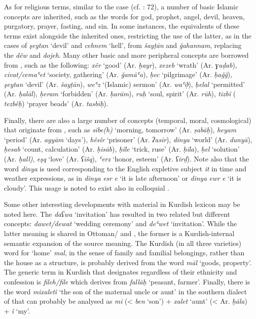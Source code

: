 \documentclass[output=paper]{langsci/langscibook}
\begin{document}
As for religious terms, similar to the  case (cf. \citealt{Perry2012}: 72), a number of basic Islamic concepts are inherited, such as the words for god, prophet, angel, devil, heaven, purgatory, prayer, fasting, and sin. In some instances, the  equivalents of these terms exist alongside the inherited ones, restricting the use of the latter, as in the cases of \textit{şeytan} ‘devil’ and \textit{cehnem} ‘hell’, from  \textit{šayṭān} and \textit{ǧahannam}, replacing the  \textit{dêw} and \textit{dojeh}. Many other basic and more peripheral concepts are borrowed from , such as the following: \textit{xêr} ‘good’ (Ar. \textit{ḫayr}), \textit{xezeb} ‘wrath’ (Ar. \textit{ɣaḍab}), \textit{civat/cemaʿet} ‘society, gathering’ (Ar. \textit{ǧamāʿa}), \textit{ḥec} ‘pilgrimage’ (Ar. \textit{ḥaǧǧ}), \textit{şeytan} ‘devil’ (Ar. \textit{šayṭān}), \textit{weʿz} ‘(Islamic) sermon’ (Ar. \textit{waʿð̣}), \textit{ḥelal} ‘permitted’ (Ar. \textit{ḥalāl}), \textit{ḥeram} ‘forbidden’ (Ar. \textit{ḥarām}), \textit{ruḥ} ‘soul, spirit’ (Ar. \textit{rūh}), \textit{tizbî} ( \textit{tezbêḥ}) ‘prayer beads’ (Ar. \textit{tasbīḥ}).  

Finally, there are also a large number of concepts (temporal, moral, cosmological) that originate from  , such as \textit{sibe(h)} ‘morning, tomorrow’ (Ar. \textit{ṣabāḥ}), \textit{heyam} ‘period’ (Ar. \textit{ayyām} ‘days’), \textit{hêsîr} ‘prisoner’ (Ar. \textit{ʔasīr}), \textit{dinya} ‘world’ (Ar. \textit{dunyā}), \textit{ḥesab} ‘count, calculation’ (Ar. \textit{ḥisāb}), \textit{ḥîle} ‘trick, ruse’ (Ar. \textit{ḥīla}), \textit{ḥel}  ‘solution’ (Ar. \textit{ḥall)}, \textit{eşq} ‘love’ (Ar. \textit{ʕišq}), \textit{ʿerz} ‘honor, esteem’ (Ar. \textit{ʕirḍ}). Note also that the word \textit{dinya} is used corresponding to the English expletive subject \textit{it} in time and weather expressions, as in \textit{dinya} \textit{esr} \textit{e} ‘it is late afternoon’ or \textit{dinya} \textit{ewr} \textit{e} ‘it is cloudy’. This usage is noted to exist also in colloquial  \citep[155]{Chyet2003}.

Some other interesting developments with  material in Kurdish lexicon may be noted here. The  \textit{daʕwa} ‘invitation’ has resulted in two related but different concepts: \textit{dawet/dewat} ‘wedding ceremony’ and \textit{deʿwet} ‘invitation’. While the latter meaning is shared in Ottoman/ and , the former is a Kurdish-internal semantic expansion of the source meaning. The Kurdish (in all three varieties) word for ‘home’ \textit{mal}, in the sense of family and familial belongings, rather than the house as a structure, is probably derived from the  word \textit{māl} ‘goods, property’. The generic term in Kurdish that designates  regardless of their ethnicity and confession is \textit{fileh/file} which derives from  \textit{fallāḥ} ‘peasant, farmer’. Finally, there is the word \textit{mixaletî} ‘the son of the maternal uncle or aunt’ in the southern  dialect of  that can probably be analysed as \textit{mi} (< \textit{ben} ‘son’) + \textit{xalet} ‘aunt’ (< Ar. \textit{ḫāla}) + \textit{î} ‘my’.
\end{document}
